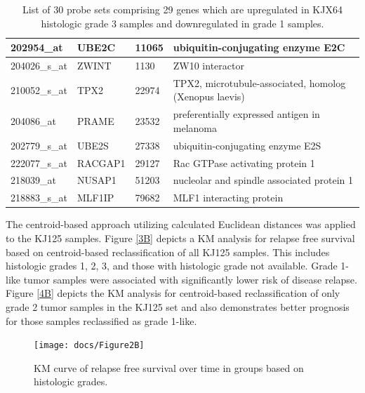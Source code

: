 \documentclass[a4paper,10pt]{article}
\begin{document}
\begin{table}
\begin{tabular}{| l | l | l | l | }
202954\_at & UBE2C & 11065 & ubiquitin-conjugating enzyme E2C\\ \hline 
204026\_s\_at & ZWINT & 1130 & ZW10 interactor\\ \hline 
210052\_s\_at & TPX2 & 22974 & TPX2, microtubule-associated, homolog (Xenopus laevis)\\ \hline 
204086\_at & PRAME & 23532 & preferentially expressed antigen in melanoma\\ \hline 
202779\_s\_at & UBE2S & 27338 & ubiquitin-conjugating enzyme E2S\\ \hline 
222077\_s\_at & RACGAP1 & 29127 & Rac GTPase activating protein 1\\ \hline 
218039\_at & NUSAP1 & 51203 & nucleolar and spindle associated protein 1\\ \hline 
218883\_s\_at & MLF1IP & 79682 & MLF1 interacting protein\\ \hline
\end{tabular}

\caption{List of 30 probe sets comprising 29 genes which are upregulated in KJX64 histologic 
grade 3 samples and downregulated in grade 1 samples.}\label{T1}

\end{table}


The centroid-based approach utilizing calculated Euclidean distances was applied to the 
KJ125 samples.   Figure \ref{3B} depicts a KM analysis for relapse free survival based on 
centroid-based reclassification of all KJ125 samples. This includes histologic grades 1, 2, 3, 
and those with histologic grade not available.  Grade 1-like tumor samples were associated 
with significantly lower risk of disease relapse.  Figure \ref{4B} depicts the KM analysis for 
centroid-based reclassification of only grade 2 tumor samples in the KJ125 set and 
also demonstrates better prognosis for those samples reclassified as grade 1-like. 
\begin{figure}
\centering
\texttt{[image: docs/Figure2B]}
\caption{ KM curve of relapse free survival over time in groups based on histologic grades.}\label{2B}
\end{figure}
\end{document}
